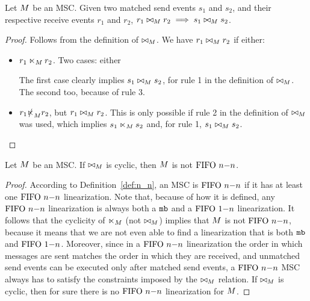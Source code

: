 \begin{proposition}
	Let $M$ be an MSC. Given two matched send events $s_1$ and $s_2$, and their respective receive events $r_1$ and $r_2$, $r_1 \bowtie_M r_2 \implies s_1 \bowtie_M s_2$.
\end{proposition}
\begin{proof}
Follows from the definition of $\bowtie_M$. We have $r_1 \bowtie_M r_2$ if either:
\begin{itemize}\itemsep=0.5ex
	\item $r_1 \ltimes_M r_2$. Two cases: either \begin{enumerate*}[label={(\roman*)}]
		\item $s_1 \nnrel_\msc s_2$, or 
		\item $s_1 \slashed{\nnrel}_\msc s_2$.
	\end{enumerate*}
	The first case clearly implies $s_1 \bowtie_M s_2$, for rule 1 in the definition of $\bowtie_M$. The second too, because of rule 3.
	\item  $r_1 \slashed{\ltimes}_M r_2$, but $r_1 \bowtie_M r_2$. This is only possible if rule 2 in the definition of $\bowtie_M$ was used, which implies $s_1 \nnrel_\msc s_2$ and, for rule 1, $s_1 \bowtie_M s_2$.
\end{itemize}
\end{proof}

\begin{proposition}\label{prop:n_n_cycl}
	Let $M$ be an MSC. If $\bowtie_M$ is cyclic, then $M$ is not $\text{FIFO } n\mathsf{-}n$.
\end{proposition}
\begin{proof}
According to Definition~\ref{def:n_n}, an MSC is $\text{FIFO } n\mathsf{-}n$ if it has at least one $\text{FIFO } n\mathsf{-}n$ linearization. Note that, because of how it is defined, any $\text{FIFO } n\mathsf{-}n$ linearization is always both a $\mathtt{mb}$ and a $\text{FIFO } 1\mathsf{-}n$ linearization. It follows that the cyclicity of $\ltimes_M$ (not $\bowtie_M$) implies that $M$ is not $\text{FIFO } n\mathsf{-}n$, because it means that we are not even able to find a linearization that is both $\mathtt{mb}$ and $\text{FIFO } 1\mathsf{-}n$. Moreover, since in a $\text{FIFO } n\mathsf{-}n$ linearization the order in which messages are sent matches the order in which they are received, and unmatched send events can be executed only after matched send events, a $\text{FIFO } n\mathsf{-}n$ MSC always has to satisfy the constraints imposed by the $\bowtie_M$ relation. If $\bowtie_M$ is cyclic, then for sure there is no $\text{FIFO } n\mathsf{-}n$ linearization for $M$.
\end{proof}

